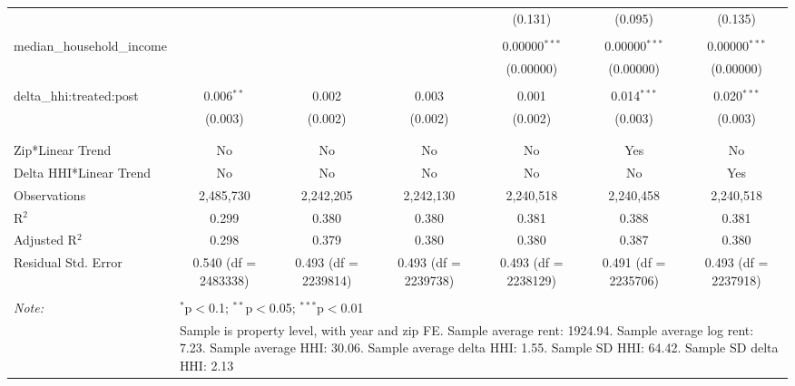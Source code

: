 \begin{table}[H]
{\begin{tabular}{@{\extracolsep{5pt}}lcccccc}
   &  &  &  & (0.131) & (0.095) & (0.135) \\  

   & & & & & & \\  

  median\_household\_income &  &  &  & 0.00000$^{***}$ & 0.00000$^{***}$ & 0.00000$^{***}$ \\  

   &  &  &  & (0.00000) & (0.00000) & (0.00000) \\  

   & & & & & & \\  

  delta\_hhi:treated:post & 0.006$^{**}$ & 0.002 & 0.003 & 0.001 & 0.014$^{***}$ & 0.020$^{***}$ \\  

   & (0.003) & (0.002) & (0.002) & (0.002) & (0.003) & (0.003) \\  

   & & & & & & \\  

 \hline \\[-1.8ex]  

 Zip*Linear Trend & No & No & No & No & Yes & No \\  

 Delta HHI*Linear Trend & No & No & No & No & No & Yes \\  

 Observations & 2,485,730 & 2,242,205 & 2,242,130 & 2,240,518 & 2,240,458 & 2,240,518 \\  

 R$^{2}$ & 0.299 & 0.380 & 0.380 & 0.381 & 0.388 & 0.381 \\  

 Adjusted R$^{2}$ & 0.298 & 0.379 & 0.380 & 0.380 & 0.387 & 0.380 \\  

 Residual Std. Error & 0.540 (df = 2483338) & 0.493 (df = 2239814) & 0.493 (df = 2239738) & 0.493 (df = 2238129) & 0.491 (df = 2235706) & 0.493 (df = 2237918) \\  

 \hline  

 \hline \\[-1.8ex]  

 \textit{Note:}  & \multicolumn{6}{l}{$^{*}$p$<$0.1; $^{**}$p$<$0.05; $^{***}$p$<$0.01} \\  

  & \multicolumn{6}{l}{Sample is property level, with year and zip FE. Sample average rent: 1924.94. Sample average log rent: 7.23. Sample average HHI: 30.06. Sample average delta HHI: 1.55. Sample SD HHI: 64.42. Sample SD delta HHI: 2.13} \\  

 \end{tabular}}  

 \end{table}  

